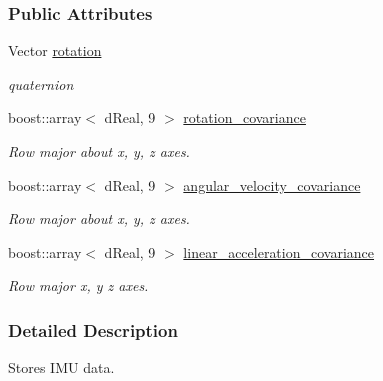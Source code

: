\subsubsection*{Public Attributes}
\begin{DoxyCompactItemize}
\item 
\hypertarget{classOpenRAVE_1_1SensorBase_1_1IMUSensorData_adcc1400504c6a7e1ebe11f8b3509dc98}{
Vector \hyperlink{classOpenRAVE_1_1SensorBase_1_1IMUSensorData_adcc1400504c6a7e1ebe11f8b3509dc98}{rotation}}
\label{classOpenRAVE_1_1SensorBase_1_1IMUSensorData_adcc1400504c6a7e1ebe11f8b3509dc98}

\begin{DoxyCompactList}\small\item\em quaternion \item\end{DoxyCompactList}\item 
\hypertarget{classOpenRAVE_1_1SensorBase_1_1IMUSensorData_ac92fd04e82ac5cc44f033b3659c5182d}{
boost::array$<$ dReal, 9 $>$ \hyperlink{classOpenRAVE_1_1SensorBase_1_1IMUSensorData_ac92fd04e82ac5cc44f033b3659c5182d}{rotation\_\-covariance}}
\label{classOpenRAVE_1_1SensorBase_1_1IMUSensorData_ac92fd04e82ac5cc44f033b3659c5182d}

\begin{DoxyCompactList}\small\item\em Row major about x, y, z axes. \item\end{DoxyCompactList}\item 
\hypertarget{classOpenRAVE_1_1SensorBase_1_1IMUSensorData_af4e4754ff773f46a8d84914bdb58b9da}{
boost::array$<$ dReal, 9 $>$ \hyperlink{classOpenRAVE_1_1SensorBase_1_1IMUSensorData_af4e4754ff773f46a8d84914bdb58b9da}{angular\_\-velocity\_\-covariance}}
\label{classOpenRAVE_1_1SensorBase_1_1IMUSensorData_af4e4754ff773f46a8d84914bdb58b9da}

\begin{DoxyCompactList}\small\item\em Row major about x, y, z axes. \item\end{DoxyCompactList}\item 
\hypertarget{classOpenRAVE_1_1SensorBase_1_1IMUSensorData_a1c562fb548b2c60ca77b610ca43f0244}{
boost::array$<$ dReal, 9 $>$ \hyperlink{classOpenRAVE_1_1SensorBase_1_1IMUSensorData_a1c562fb548b2c60ca77b610ca43f0244}{linear\_\-acceleration\_\-covariance}}
\label{classOpenRAVE_1_1SensorBase_1_1IMUSensorData_a1c562fb548b2c60ca77b610ca43f0244}

\begin{DoxyCompactList}\small\item\em Row major x, y z axes. \item\end{DoxyCompactList}\end{DoxyCompactItemize}


\subsubsection{Detailed Description}
Stores IMU data. 